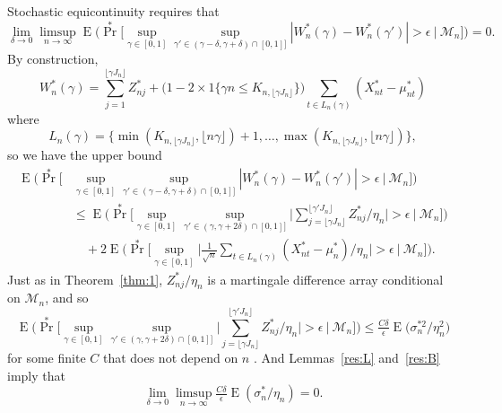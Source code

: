 \documentclass[11pt]{article}
\theoremstyle{definition}
\DeclareMathOperator{\E}{E}
\DeclareMathOperator{\pr}{Pr}
\begin{document}
  Stochastic equicontinuity requires that
  \begin{equation}\label{eq:22} 
    \lim_{\delta \to 0} \limsup_{n \to \infty} \E\Big( \pr^{*}\Big[\sup_{\gamma
    \in [0,1]} \sup_{\gamma' \in (\gamma-\delta, \gamma+\delta) \cap
    [0,1]]} |W_n^{*}(\gamma) - W_n^{*}(\gamma')| >
  \epsilon \ \Big|\ \mathcal{M}_n \Big]\Big) = 0.
  \end{equation}
  By construction,
  \begin{equation*}
    W_n^*(\gamma) = \sum_{j=1}^{\lfloor \gamma J_n \rfloor} Z_{nj}^*  +
    \big(1 - 2 \times 1\{ \gamma n \leq K_{n, \lfloor \gamma J_n \rfloor}\}\big)
    \sum_{t \in L_n(\gamma)} (X_{nt}^* - \mu_{nt}^*)
  \end{equation*}
  where 
  \[L_n(\gamma) =
  \{\min(K_{n,\lfloor \gamma J_n \rfloor}, \lfloor n \gamma \rfloor) + 1,\dots,
  \max(K_{n,\lfloor \gamma J_n \rfloor}, \lfloor n \gamma \rfloor)\},
  \]
  so we have the upper bound
  \begin{align}\label{eq:27}
    \E \Big(\pr^{*}\Big[&\sup_{\gamma \in [0,1]} \sup_{\gamma' \in
      (\gamma-\delta, \gamma+\delta) \cap [0,1]]}
    |W_n^{*}(\gamma) - W_n^{*}(\gamma')| > \epsilon \
    \Big|\ \mathcal{M}_n \Big]\Big) \nonumber \\
    &\leq \E \Big(\pr^{*} \Big[\sup_{\gamma \in [0,1]} \sup_{\gamma' \in
      (\gamma, \gamma+2\delta) \cap [0,1]]} \Big\lvert
    \sum_{j={\lfloor \gamma J_n \rfloor}}^{\lfloor \gamma'J_n \rfloor}
    Z_{nj}^{*}/ \eta_n \Big\rvert > \epsilon \
    \Big|\ \mathcal{M}_n \Big]\Big) \nonumber \\
    &\quad+ 2 \E \Big(\pr^{*} \Big[\sup_{\gamma \in [0,1]} \Big\lvert
    \tfrac{1}{\sqrt{n}} \sum_{t \in L_n(\gamma)} (X_{nt}^{*} -
    \mu_n^{*}) / \eta_{n}\Big\rvert > \epsilon \ \Big|\ \mathcal{M}_n \Big]\Big).
  \end{align}
  Just as in Theorem~\ref{thm:1}, $Z_{nj}^{*}/\eta_n$ is a martingale
  difference array conditional on $\mathcal{M}_n$, and so
  \begin{equation*}
    \E \Big(\pr^{*} \Big[\sup_{\gamma \in [0,1]} \sup_{\gamma' \in
      (\gamma, \gamma+2\delta) \cap [0,1]]} \Big\lvert 
    \sum_{j={\lfloor \gamma J_n \rfloor}}^{\lfloor \gamma'J_n \rfloor}
    Z_{nj}^{*} / \eta_n \Big\rvert > \epsilon \
    \Big|\ \mathcal{M}_n \Big]\Big) \leq \tfrac{C \delta}{\epsilon} \E\big(\sigma_n^{*2}/\eta_n^2\big)
  \end{equation*}
  for some finite $C$ that does not depend on $n$ \citep[using,
  e.g.][Theorem~15.14]{Dav:94}. And Lemmas~\ref{res:L} and~\ref{res:B}
  imply that
  \begin{equation*}
    \lim_{\delta \to 0}\limsup_{n\to\infty}  \tfrac{C \delta}{\epsilon} \E(\sigma_n^{*} /
    \eta_n) = 0.
  \end{equation*}
\end{document}
